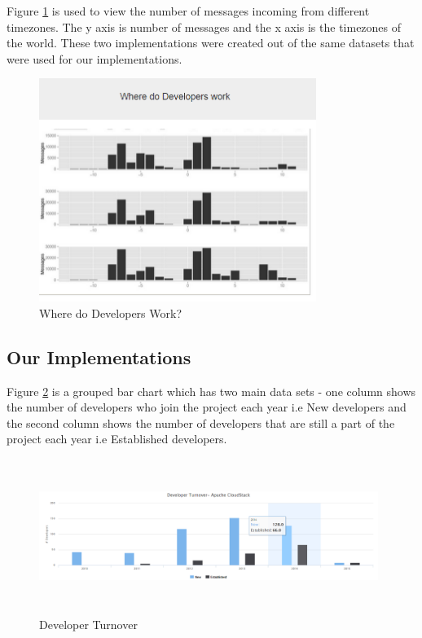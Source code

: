 \documentclass[seploa]{beavtex}
\begin{document}
Figure \ref{fig:devWork} is used to view the number of messages incoming from different timezones. The y axis is number of messages and the x axis is the timezones of the world. These two implementations were created out of the same datasets that were used for our implementations.

\begin{figure}[H]
\begin{center}
\includegraphics[width=90mm]{image12.PNG}
\end{center}
\caption{Where do Developers Work?}
\label{fig:devWork}
\end{figure}

\subsection{Our Implementations}
Figure \ref{fig:devTurn} is a grouped bar chart which has two main data sets - one column shows the number of developers who join the project each year i.e New developers and the second column shows the number of developers that are still a part of the project each year i.e Established developers.

\begin{figure}[H]
\centering
\includegraphics[width=110mm,height=50mm]{image1.PNG}
\caption{Developer Turnover}
\label{fig:devTurn}
\end{figure}
\end{document}
